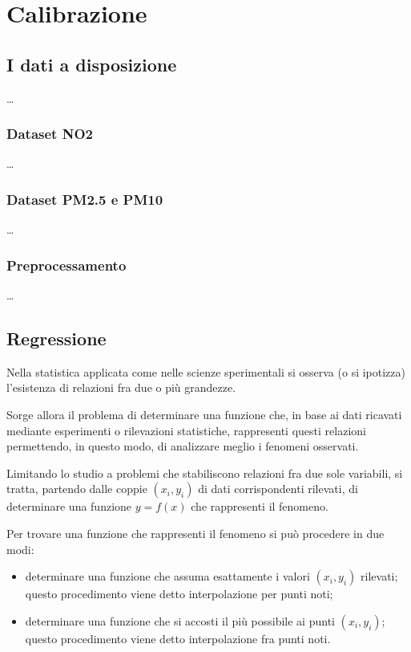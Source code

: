 \chapter{Calibrazione}\label{ch:calibrazione}

\section{I dati a disposizione}\label{sec:dati}
\ldots

\subsection{Dataset NO2}\label{ssec:dataset-no2}
\ldots

\subsection{Dataset PM2.5 e PM10}\label{ssec:dataset-pm}
\ldots

\subsection{Preprocessamento}\label{ssec:preprocessamento}
\ldots

\section{Regressione}\label{sec:regressione}
Nella statistica applicata come nelle scienze sperimentali si osserva (o si ipotizza) l’esistenza di relazioni fra due o più grandezze.

Sorge allora il problema di determinare una funzione che, in base ai dati ricavati mediante esperimenti o rilevazioni statistiche, rappresenti questi relazioni permettendo, in questo modo, di analizzare meglio i fenomeni osservati.

Limitando lo studio a problemi che stabiliscono relazioni fra due sole variabili, si tratta, partendo dalle coppie $(x_i, y_i)$ di dati corrispondenti rilevati, di determinare una funzione $y=f(x)$ che rappresenti il fenomeno.

Per trovare una funzione che rappresenti il fenomeno si può procedere in due modi:

\begin{itemize}
  \item determinare una funzione che assuma esattamente i valori $(x_i, y_i)$ rilevati; questo procedimento viene detto interpolazione per punti noti;
  \item determinare una funzione che si accosti il più possibile ai punti $(x_i, y_i)$; questo procedimento viene detto interpolazione fra punti noti.
\end{itemize}

